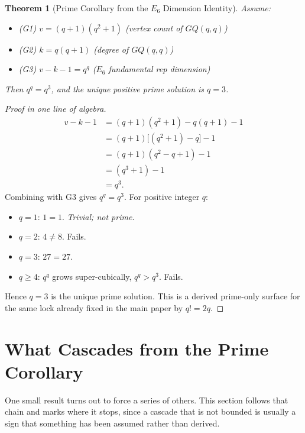 \documentclass[12pt,a4paper]{article}
\def\mathrm#1{#1}%
\def\textbf#1{#1}%
\newtheorem{theorem}{Theorem}[section]
\theoremstyle{definition}
\newcommand{\GQ}{\mathrm{GQ}}
\begin{document}
\begin{theorem}[Prime Corollary from the $E_6$ Dimension Identity]
\label{thm:prime-corollary-e6}
Assume:
\begin{itemize}[leftmargin=2em]
\item \textbf{(G1)} $v = (q+1)(q^2+1)$ \hfill (vertex count of $\GQ(q,q)$)
\item \textbf{(G2)} $k = q(q+1)$ \hfill (degree of $\GQ(q,q)$)
\item \textbf{(G3)} $v - k - 1 = q^q$ \hfill (\textbf{$E_6$ fundamental rep dimension})
\end{itemize}
Then $q^q = q^3$, and the unique positive prime solution is $q=3$.
\end{theorem}

\begin{proof}[Proof in one line of algebra]
\begin{align*}
v - k - 1
&= (q+1)(q^2+1) - q(q+1) - 1 \\
&= (q+1)\bigl[(q^2+1) - q\bigr] - 1 \\
&= (q+1)(q^2 - q + 1) - 1 \\
&= (q^3 + 1) - 1 \tag{sum-of-cubes factorization} \\
&= q^3.
\end{align*}
Combining with G3 gives $q^q = q^3$. For positive integer $q$:
\begin{itemize}[leftmargin=2em]
\item $q=1$: $1=1$. \emph{Trivial; not prime.}
\item $q=2$: $4 \ne 8$. Fails.
\item $q=3$: $27 = 27$. \checkmark
\item $q \ge 4$: $q^q$ grows super-cubically, $q^q > q^3$. Fails.
\end{itemize}
Hence $q=3$ is the unique prime solution. This is a derived prime-only
surface for the same lock already fixed in the main paper by $q!=2q$.
\qedhere
\end{proof}

\section*{What Cascades from the Prime Corollary}

\begin{plainbox}
One small result turns out to force a series of others. This section follows that
chain and marks where it stops, since a cascade that is not bounded is usually a sign that
something has been assumed rather than derived.
\end{plainbox}
\end{document}
